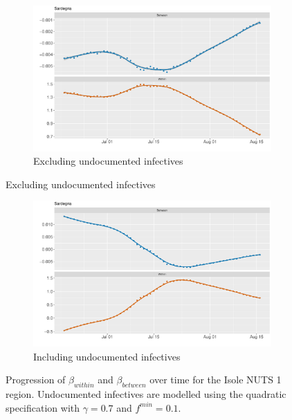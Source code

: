 \documentclass[12pt]{article}
\begin{document}
\begin{appendices}
		\begin{figure}[H]
    	    \centering
    	    \begin{subfigure}{\textwidth}
    	      \centering
    	      \includegraphics[width=0.8\linewidth]{output/model_between_lag14_betas_Isole_rolling.pdf}
    	      \caption{Excluding undocumented infectives}
    	      \label{fig:beta_between_over_time_isole_regular}
    	    \end{subfigure}
        \end{figure}
        \begin{figure}[H]\ContinuedFloat
    	    \begin{subfigure}{\textwidth}
    	      \centering
    	      \includegraphics[width=0.8\linewidth]{output/model_between_lag14_betas_Isole_UndocQuadratic_rolling.pdf}
    	      \caption{Including undocumented infectives}
    	      \label{fig:beta_between_over_time_isole_regular_undoc}
    	    \end{subfigure}
    	    \caption{Progression of $\beta_{within}$ and $\beta_{between}$ over time for the Isole NUTS 1 region. Undocumented infectives are modelled using the quadratic specification with $\gamma = 0.7$ and $f^{min}=0.1$.}
    	    \label{fig:beta_between_over_time_isole}
        \end{figure}
		

\end{appendices}
\end{document}
